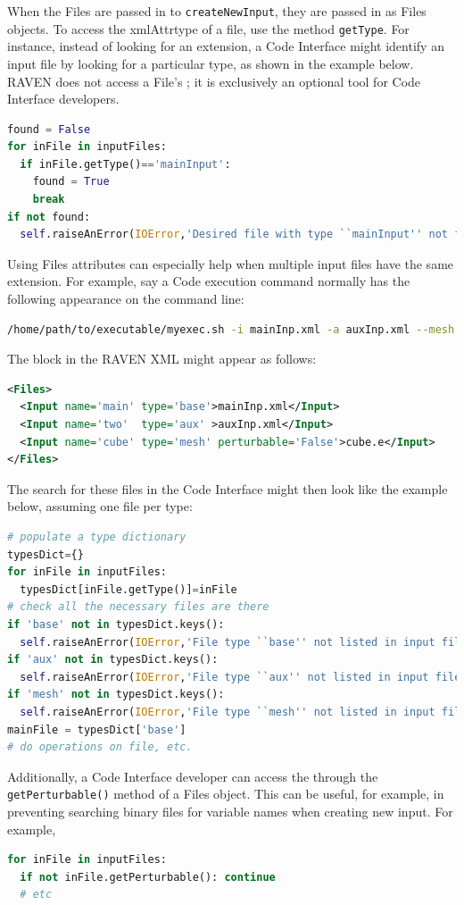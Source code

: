 When the Files are passed in to \texttt{createNewInput}, they are passed in as Files objects. To access the xmlAttr{type} of a file, use the method \texttt{getType}.  For instance, instead of looking for an extension, a Code Interface might identify an input file by looking for a particular type, as shown in the example below. \nb RAVEN does not access a File's ; it is exclusively an optional tool for Code Interface developers.

\begin{lstlisting}[language=python,showstringspaces=false]
found = False
for inFile in inputFiles:
  if inFile.getType()=='mainInput':
    found = True
    break
if not found:
  self.raiseAnError(IOError,'Desired file with type ``mainInput'' not found!')
\end{lstlisting}
Using Files  attributes can especially help when multiple input files have the same extension.  For example, say a Code execution command normally has the following appearance on the command line:
\begin{lstlisting}[language=bash]
/home/path/to/executable/myexec.sh -i mainInp.xml -a auxInp.xml --mesh cube.e
\end{lstlisting}
The  block in the RAVEN XML might appear as follows:
\begin{lstlisting}[language=XML]
<Files>
  <Input name='main' type='base'>mainInp.xml</Input>
  <Input name='two'  type='aux' >auxInp.xml</Input>
  <Input name='cube' type='mesh' perturbable='False'>cube.e</Input>
</Files>
\end{lstlisting}
The search for these files in the Code Interface might then look like the example below, assuming one file per type:
\begin{lstlisting}[language=python,showstringspaces=false]
# populate a type dictionary
typesDict={}
for inFile in inputFiles:
  typesDict[inFile.getType()]=inFile
# check all the necessary files are there
if 'base' not in typesDict.keys():
  self.raiseAnError(IOError,'File type ``base'' not listed in input file!')
if 'aux' not in typesDict.keys():
  self.raiseAnError(IOError,'File type ``aux'' not listed in input file!')
if 'mesh' not in typesDict.keys():
  self.raiseAnError(IOError,'File type ``mesh'' not listed in input file!')
mainFile = typesDict['base']
# do operations on file, etc.
\end{lstlisting}

Additionally, a Code Interface developer can access the  through the \texttt{getPerturbable()} method of a Files object.  This can be useful, for example, in preventing searching binary files for variable names when creating new input. For example,
\begin{lstlisting}[language=python]
for inFile in inputFiles:
  if not inFile.getPerturbable(): continue
  # etc
\end{lstlisting}
